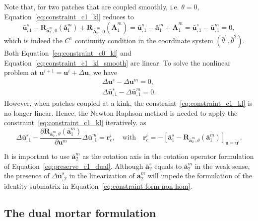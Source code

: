 Note that, for two patches that are coupled smoothly, i.e. $\theta=0$, Equation~\eqref{eq:constraint_c1_kl} reduces to
\begin{equation}
	\bar{\mathbf{u}}^s_{,1} - \mathbf{R}_{\bar{\mathbf{a}}^m_2,0}(\bar{\mathbf{a}}^m_1) + \mathbf{R}_{\bar{\mathbf{A}}^m_2,0}(\bar{\mathbf{A}}^m_1) = \bar{\mathbf{u}}^s_{,1} - \bar{\mathbf{a}}^m_1 + \bar{\mathbf{A}}^m_1 = \bar{\mathbf{u}}^s_{,1} - \bar{\mathbf{u}}^m_{,1} = 0,\label{eq:constraint_c1_kl_smooth}
\end{equation}
which is indeed the $C^1$ continuity condition in the coordinate system $(\bar{\theta}^1, \bar{\theta}^2)$. Both Equation~\eqref{eq:constraint_c0_kl} and Equation~\eqref{eq:constraint_c1_kl_smooth} are linear. To solve the nonlinear problem at $\mathbf{u}^{i+1} = \mathbf{u}^{i} +{\Delta} \mathbf{u}$, we have
\begin{subequations}
	\begin{align}
		\Delta\mathbf{u}^s-\Delta\mathbf{u}^m=0, \\
		\Delta\bar{\mathbf{u}}^s_{,1} - \Delta\bar{\mathbf{u}}^m_{,1} = 0.
	\end{align}
\end{subequations}
However, when patches coupled at a kink, the constraint~\eqref{eq:constraint_c1_kl} is no longer linear. Hence, the Newton-Raphson method is needed to apply the constraint~\eqref{eq:constraint_c1_kl} iteratively. as
\begin{equation}
	\Delta\bar{\mathbf{u}}^s_{,1}-\frac{\partial \mathbf{R}_{\bar{\mathbf{a}}^m_2,\theta}(\bar{\mathbf{a}}^m_1)}{\partial \mathbf{u}^m}\Delta\bar{\mathbf{u}}^m_{,1} = \mathbf{r}_c^i,\quad\text{with}\quad \mathbf{r}_c^i = -\left[\bar{\mathbf{a}}^s_1 - \mathbf{R}_{\bar{\mathbf{a}}^m_2,\theta}(\bar{\mathbf{a}}^m_1)\right]_{\mathbf{u}=\mathbf{u}^{i}}.
\end{equation}

\begin{remark}
	It is important to use $\bar{\mathbf{a}}^m_2$ as the rotation axis in the rotation operator formulation of Equation~\eqref{eq:preserve_c1_dual}. Although $\bar{\mathbf{a}}^s_2$ equals to $\bar{\mathbf{a}}^m_2$ in the weak sense, the presence of $\Delta\bar{\mathbf{u}}^s_{,2}$ in the linearization of $\bar{\mathbf{a}}^m_2$ will impede the formulation of the identity submatrix in Equation~\eqref{eq:constraint-form-non-hom}.
\end{remark}

\subsection{The dual mortar formulation}

